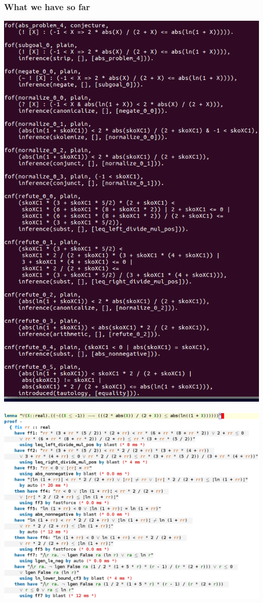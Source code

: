 \documentclass{beamer}
\begin{document}
\begin{frame}
\frametitle{What we have so far}
\begin{minipage}{0.35\linewidth}
\includegraphics[scale=0.18]{MT_proof}
\end{minipage}
\hfill
\begin{minipage}{0.57\linewidth}
\includegraphics[scale=0.18]{isabelle_proof}

\end{minipage}
\end{frame}
\end{document}
